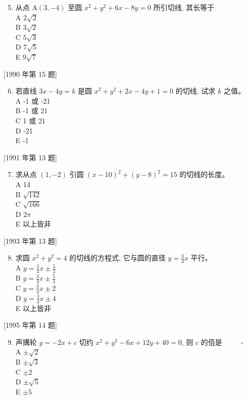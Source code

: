 \documentclass[10pt]{article}
\begin{document}
\begin{enumerate}
  \setcounter{enumi}{4}
  \item 从点 $\mathrm{A}(3,-4)$ 至圆 $x^{2}+y^{2}+6 x-8 y=0$ 所引切线, 其长等于 $\qquad$\\
A $2 \sqrt{2}$\\
B $3 \sqrt{2}$\\
C $5 \sqrt{3}$\\
D $7 \sqrt{5}$\\
E $9 \sqrt{7}$
\end{enumerate}

[1990 年第 15 题]

\begin{enumerate}
  \setcounter{enumi}{5}
  \item 若直线 $3 x-4 y=k$ 是圆 $x^{2}+y^{2}+2 x-4 y+1=0$ 的切线, 试求 $k$ 之值。\\
A -1 或 -21\\
B -1 或 21\\
C 1 或 21\\
D -21\\
E -1
\end{enumerate}

[1991 年第 13 题]

\begin{enumerate}
  \setcounter{enumi}{6}
  \item 求从点 $(1,-2)$ 引圆 $(x-10)^{2}+(y-8)^{2}=15$ 的切线的长度。\\
A 14\\
B $\sqrt{142}$\\
C $\sqrt{166}$\\
D $2 \pi$\\
E 以上皆非
\end{enumerate}

[1993 年第 13 题]

\begin{enumerate}
  \setcounter{enumi}{7}
  \item 求圆 $x^{2}+y^{2}=4$ 的切线的方程式, 它与圆的直径 $y=\frac{3}{4} x$ 平行。\\
A $y=\frac{3}{4} x \pm \frac{5}{2}$\\
B $y=\frac{3}{4} x \pm \frac{5}{4}$\\
C $y=\frac{3}{4} x \pm 2$\\
D $y=\frac{3}{4} x \pm 4$\\
E 以上皆非
\end{enumerate}

[1995 年第 14 题]

\begin{enumerate}
  \setcounter{enumi}{8}
  \item 声搆轮 $y=-2 x+c$ 切约 $x^{2}+y^{2}-6 x+12 y+40=0$, 则 $c$ 的佰是 $\qquad$ -\\
A $\pm \sqrt{2}$\\
B $\pm \sqrt{3}$\\
C $\pm 2$\\
D $\pm \sqrt{5}$\\
E $\pm 5$
\end{enumerate}
\end{document}
